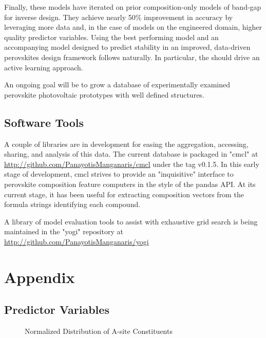 \documentclass[aip, jmp, amsmath, amssymb, nofootinbib]{revtex4-2}
\begin{document}
Finally, these models have iterated on prior composition-only models
of band-gap for inverse
design\cite{mannodi-kanakkithodi-2022-data-driven}. They achieve nearly
50\% improvement in accuracy by leveraging more data and, in the case
of models on the engineered domain, higher quality predictor
variables. Using the best performing model and an accompanying model
designed to predict stability in an improved, data-driven perovskites
design framework follows naturally.  In particular, the  should
drive an active learning approach.

An ongoing goal will be to grow a database of experimentally examined
perovskite photovoltaic prototypes with well defined structures.

\subsection*{Software Tools}
\label{sec:org050f82f}
A couple of libraries are in development for easing the aggregation,
accessing, sharing, and analysis of this data. The current database is
packaged in "cmcl" at \url{http://github.com/PanayotisManganaris/cmcl} under
the tag v0.1.5. In this early stage of development, cmcl strives to
provide an "inquisitive" interface to perovskite composition feature
computers in the style of the pandas API. At its current stage, it has
been useful for extracting composition vectors from the formula
strings identifying each compound.

A library of model evaluation tools to assist with exhaustive grid
search is being maintained in the "yogi" repository at
\url{http://github.com/PanayotisManganaris/yogi}

\section*{}
\label{sec:orgaeda7a2}
\pagebreak


\printglossaries

\section*{Appendix}
\label{sec:orgb413660}
\subsection*{Predictor Variables}
\label{sec:orgc3205dc}
 
\begin{figure}[htbp]
\centering

\caption{Normalized Distribution of A-site Constituents}
\end{figure}
\end{document}
